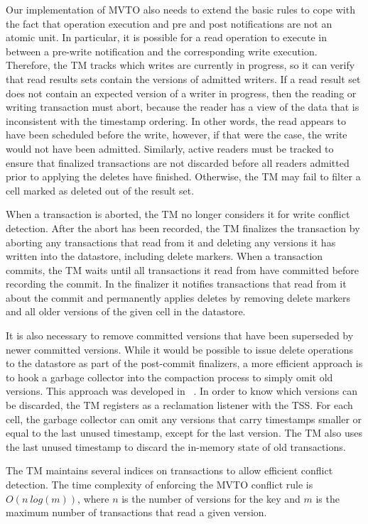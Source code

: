 \documentclass[10pt,final,journal]{IEEEtran}
\begin{document}
Our implementation of MVTO also needs to extend the basic rules to cope with the fact that operation execution and pre and post notifications are not an atomic unit. In particular, it is possible for a read operation to execute in between a pre-write notification and the corresponding write execution. Therefore, the TM tracks which writes are currently in progress, so it can verify that read results sets contain the versions of admitted writers. If a read result set does not contain an expected version of a writer in progress, then the reading or writing transaction must abort, because the reader has a view of the data that is inconsistent with the timestamp ordering. In other words, the read appears to have been scheduled before the write, however, if that were the case, the write would not have been admitted. Similarly, active readers must be tracked to ensure that finalized transactions are not discarded before all readers admitted prior to applying the deletes have finished. Otherwise, the TM may fail to filter a cell marked as deleted out of the result set.

When a transaction is aborted, the TM no longer considers it for write conflict detection. After the abort has been recorded, the TM finalizes the transaction by aborting any transactions that read from it and deleting any versions it has written into the datastore, including delete markers. When a transaction commits, the TM waits until all transactions it read from have committed before recording the commit. In the finalizer it notifies transactions that read from it about the commit and permanently applies deletes by removing delete markers and all older versions of the given cell in the datastore.

It is also necessary to remove committed versions that have been superseded by newer committed versions. While it would be possible to issue delete operations to the datastore as part of the post-commit finalizers, a more efficient approach is to hook a garbage collector into the compaction process to simply omit old versions. This approach was developed in ~\cite{Junqueira:2011:LTS:2056318.2057148}. In order to know which versions can be discarded, the TM registers as a reclamation listener with the TSS. For each cell, the garbage collector can omit any versions that carry timestamps smaller or equal to the last unused timestamp, except for the last version. The TM also uses the last unused timestamp to discard the in-memory state of old transactions.

The TM maintains several indices on transactions to allow efficient conflict detection. The time complexity of enforcing the MVTO conflict rule is $O(n \: log(m))$, where $n$ is the number of versions for the key and $m$ is the maximum number of transactions that read a given version.
\end{document}
